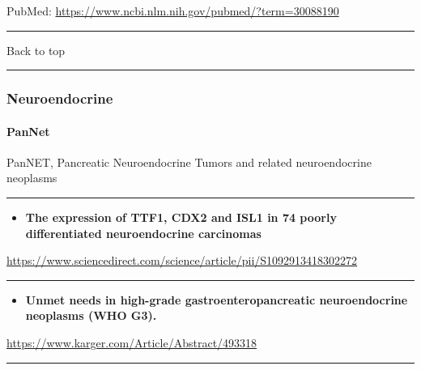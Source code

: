 \documentclass[]{article}
\providecommand{\tightlist}{%
  \setlength{\itemsep}{0pt}\setlength{\parskip}{0pt}}
\let\oldparagraph\paragraph
\renewcommand{\paragraph}[1]{\oldparagraph{#1}\mbox{}}
\begin{document}
PubMed: \url{https://www.ncbi.nlm.nih.gov/pubmed/?term=30088190}

{}

{}

\begin{center}\rule{0.5\linewidth}{\linethickness}\end{center}

Back to top

\begin{center}\rule{0.5\linewidth}{\linethickness}\end{center}

\pagebreak

\hypertarget{neuroendocrine}{%
\subsubsection{Neuroendocrine}\label{neuroendocrine}}

\hypertarget{pannet}{%
\paragraph{PanNet}\label{pannet}}

PanNET, Pancreatic Neuroendocrine Tumors and related neuroendocrine
neoplasms

\begin{center}\rule{0.5\linewidth}{\linethickness}\end{center}

\begin{itemize}
\tightlist
\item
  \textbf{The expression of TTF1, CDX2 and ISL1 in 74 poorly
  differentiated neuroendocrine carcinomas}
\end{itemize}

\url{https://www.sciencedirect.com/science/article/pii/S1092913418302272}

\begin{center}\rule{0.5\linewidth}{\linethickness}\end{center}

\begin{itemize}
\tightlist
\item
  \textbf{Unmet needs in high-grade gastroenteropancreatic
  neuroendocrine neoplasms (WHO G3).}
\end{itemize}

\url{https://www.karger.com/Article/Abstract/493318}

\begin{center}\rule{0.5\linewidth}{\linethickness}\end{center}
\end{document}
